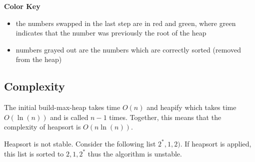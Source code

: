 \textbf{Color Key}

\begin{itemize}
    \item the numbers swapped in the last step are in {\color{red}red} and {\color{green}green}, where {\color{green}green} indicates that the number was previously the root of the heap
    \item numbers {\color{gray}grayed} out are the numbers which are correctly sorted (removed from the heap)
\end{itemize}

\subsection{Complexity}

The initial build-max-heap takes time \(O(n)\) and heapify which takes time \(O(\ln(n))\) and is called \(n - 1\) times. Together, this means that the complexity of heapsort is \(O(n \ln(n))\).\cite[p.~136]{bib:introductiontoalgorithms}

Heapsort is not stable. Consider the following list \(2^{*}, 1, 2
)\). If heapsort is applied, this list is sorted to \(2, 1, 2^{*}\) thus the algorithm is unstable.

